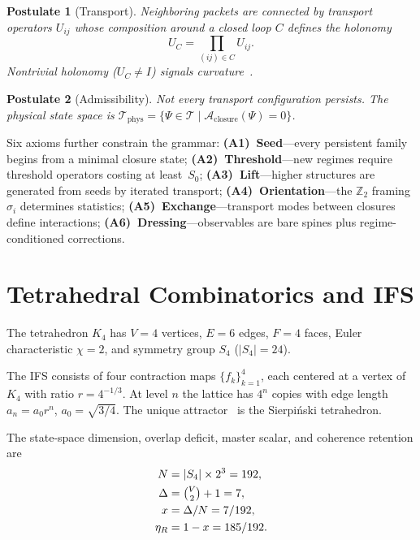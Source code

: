 \documentclass[11pt,twocolumn]{article}
\newtheorem{postulate}{Postulate}
\begin{document}
\begin{postulate}[Transport]
Neighboring packets are connected by transport operators $U_{ij}$ whose composition around a closed loop $C$ defines the holonomy
\begin{equation}
U_C = \prod_{(ij)\in C} U_{ij}.
\label{eq:holonomy}
\end{equation}
Nontrivial holonomy ($U_C\neq I$) signals curvature~\cite{wilson1974}.
\end{postulate}

\begin{postulate}[Admissibility]
Not every transport configuration persists.
The physical state space is
$\mathcal{T}_{\mathrm{phys}}=\{\Psi\in\mathcal{T}\mid\mathcal{A}_{\mathrm{closure}}(\Psi)=0\}$.
\end{postulate}

Six axioms further constrain the grammar:
\textbf{(A1)~Seed}---every persistent family begins from a minimal closure state;
\textbf{(A2)~Threshold}---new regimes require threshold operators costing at least~$S_0$;
\textbf{(A3)~Lift}---higher structures are generated from seeds by iterated transport;
\textbf{(A4)~Orientation}---the $\mathbb{Z}_2$ framing $\sigma_i$ determines statistics;
\textbf{(A5)~Exchange}---transport modes between closures define interactions;
\textbf{(A6)~Dressing}---observables are bare spines plus regime-conditioned corrections.

\section{Tetrahedral Combinatorics and IFS}
\label{sec:combinatorics}

The tetrahedron $K_4$ has $V=4$ vertices, $E=6$ edges, $F=4$ faces, Euler characteristic $\chi=2$, and symmetry group $S_4$ ($|S_4|=24$).

The IFS consists of four contraction maps $\{f_k\}_{k=1}^4$, each centered at a vertex of $K_4$ with ratio $r=4^{-1/3}$.
At level $n$ the lattice has $4^n$ copies with edge length $a_n=a_0 r^n$, $a_0=\sqrt{3/4}$.
The unique attractor~\cite{hutchinson1981} is the Sierpi\'nski tetrahedron.

The state-space dimension, overlap deficit, master scalar, and coherence retention are
\begin{align}
N &= |S_4|\times 2^3 = 192, \label{eq:N}\\
\Delta &= \tbinom{V}{2}+1 = 7, \label{eq:Delta}\\
x &= \Delta/N = 7/192, \label{eq:x}\\
\eta_R &= 1-x = 185/192. \label{eq:eta}
\end{align}
\end{document}
